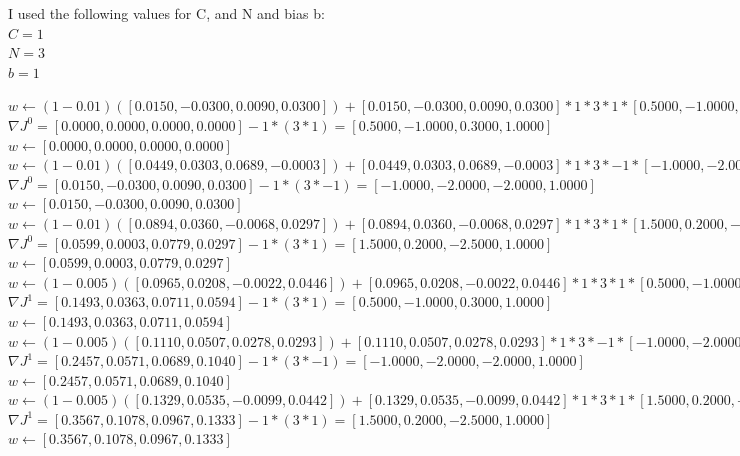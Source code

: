 \documentclass[12pt, fullpage,letterpaper]{article}
\begin{document}
\begin{enumerate}
I used the following values for C, and N and bias b:\\
$C = 1$\\
$N = 3$\\
$b = 1$

$w \leftarrow (1 - 0.01)([0.0150,-0.0300,0.0090,0.0300]) + [0.0150,-0.0300,0.0090,0.0300]*1*3*1*[0.5000,-1.0000,0.3000,1.0000]$\\
$\nabla J^0 = [0.0000,0.0000,0.0000,0.0000] - 1*(3*1) = [0.5000,-1.0000,0.3000,1.0000]$\\
$w \leftarrow [0.0000,0.0000,0.0000,0.0000]$\\

$w \leftarrow (1 - 0.01)([0.0449,0.0303,0.0689,-0.0003]) + [0.0449,0.0303,0.0689,-0.0003]*1*3*-1*[-1.0000,-2.0000,-2.0000,1.0000]$\\
$\nabla J^0 = [0.0150,-0.0300,0.0090,0.0300] - 1*(3*-1) = [-1.0000,-2.0000,-2.0000,1.0000]$\\
$w \leftarrow [0.0150,-0.0300,0.0090,0.0300]$\\

$w \leftarrow (1 - 0.01)([0.0894,0.0360,-0.0068,0.0297]) + [0.0894,0.0360,-0.0068,0.0297]*1*3*1*[1.5000,0.2000,-2.5000,1.0000]$\\
$\nabla J^0 = [0.0599,0.0003,0.0779,0.0297] - 1*(3*1) = [1.5000,0.2000,-2.5000,1.0000]$\\
$w \leftarrow [0.0599,0.0003,0.0779,0.0297]$\\

$w \leftarrow (1 - 0.005)([0.0965,0.0208,-0.0022,0.0446]) + [0.0965,0.0208,-0.0022,0.0446]*1*3*1*[0.5000,-1.0000,0.3000,1.0000]$\\
$\nabla J^1 = [0.1493,0.0363,0.0711,0.0594] - 1*(3*1) = [0.5000,-1.0000,0.3000,1.0000]$\\
$w \leftarrow [0.1493,0.0363,0.0711,0.0594]$\\

$w \leftarrow (1 - 0.005)([0.1110,0.0507,0.0278,0.0293]) + [0.1110,0.0507,0.0278,0.0293]*1*3*-1*[-1.0000,-2.0000,-2.0000,1.0000]$\\
$\nabla J^1 = [0.2457,0.0571,0.0689,0.1040] - 1*(3*-1) = [-1.0000,-2.0000,-2.0000,1.0000]$\\
$w \leftarrow [0.2457,0.0571,0.0689,0.1040]$\\

$w \leftarrow (1 - 0.005)([0.1329,0.0535,-0.0099,0.0442]) + [0.1329,0.0535,-0.0099,0.0442]*1*3*1*[1.5000,0.2000,-2.5000,1.0000]$\\
$\nabla J^1 = [0.3567,0.1078,0.0967,0.1333] - 1*(3*1) = [1.5000,0.2000,-2.5000,1.0000]$\\
$w \leftarrow [0.3567,0.1078,0.0967,0.1333]$\\


\end{enumerate}
\end{document}
